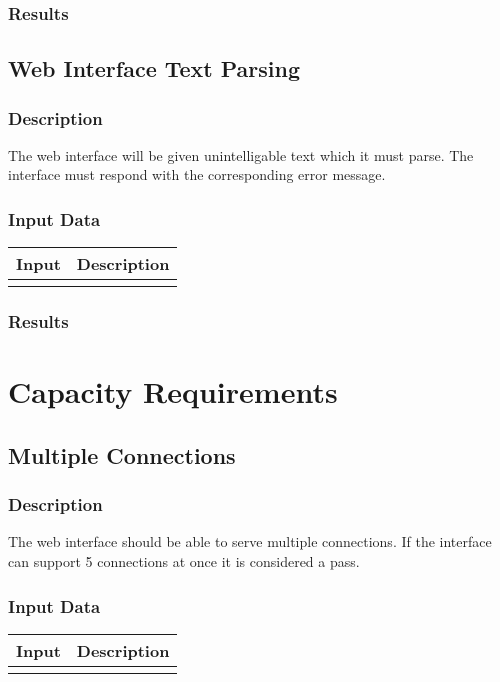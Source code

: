 \documentclass{scrreprt}
\begin{document}
\subsubsection{Results}

\subsection{Web Interface Text Parsing}
\subsubsection{Description}
\begin{flushleft}
The web interface will be given unintelligable text which it must parse. The interface must respond with the corresponding error message.
\end{flushleft}
\subsubsection{Input Data}
 \centering
 \begin{tabular}{p{3cm}p{6cm}}
 \hline\hline
 Input & Description\\
 \hline\hline
   &  \\ %
 \hline
 \end{tabular}
\subsubsection{Results}

\section{Capacity Requirements}

\subsection{Multiple Connections}
\subsubsection{Description}
\begin{flushleft}
The web interface should be able to serve multiple connections. If the interface can support 5 connections at once it is considered a pass.
\end{flushleft}
\subsubsection{Input Data}
 \centering
 \begin{tabular}{p{3cm}p{6cm}}
 \hline\hline
 Input & Description\\
 \hline\hline
   &  \\ %
 \hline
 \end{tabular}
\end{document}
